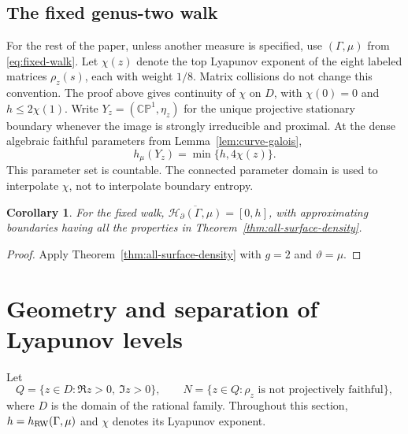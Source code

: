 \documentclass[11pt,letterpaper]{amsart}
\newtheorem{corollary}[theorem]{Corollary}
\theoremstyle{definition}
\theoremstyle{remark}
\numberwithin{equation}{section}
\newcommand{\CP}{\mathbb{CP}}
\newcommand{\HH}{\mathscr H_{\partial}}
\begin{document}
\subsection{The fixed genus-two walk}
For the rest of the paper, unless another measure is specified, use
$(\Gamma,\mu)$ from \eqref{eq:fixed-walk}. Let $\chi(z)$ denote the top
Lyapunov exponent of the eight labeled matrices $\rho_z(s)$, each with
weight $1/8$. Matrix collisions do not change this convention.
The proof above gives continuity of $\chi$ on $D$, with
$\chi(0)=0$ and $h\le2\chi(1)$. Write $Y_z=(\CP^1,\eta_z)$ for the
unique projective stationary boundary whenever the image is strongly
irreducible and proximal. At the dense algebraic faithful parameters
from Lemma~\ref{lem:curve-galois},
\begin{equation}\label{eq:entropy-at-good-parameters}
 h_\mu(Y_z)=\min\{h,4\chi(z)\}.
\end{equation}
This parameter set is countable. The connected parameter domain is
used to interpolate $\chi$, not to interpolate boundary entropy.

\begin{corollary}\label{thm:full-density}
For the fixed walk, $\overline{\HH(\Gamma,\mu)}=[0,h]$, with
approximating boundaries having all the properties in
Theorem~\ref{thm:all-surface-density}.
\end{corollary}
\begin{proof}
Apply Theorem~\ref{thm:all-surface-density} with $g=2$ and
$\vartheta=\mu$.
\end{proof}

\section{Geometry and separation of Lyapunov levels}
\label{sec:level-test}

Let
\[
 Q=\{z\in D:\Re z>0,\ \Im z>0\},\qquad
 N=\{z\in Q:\rho_z\text{ is not projectively faithful}\},
\]
where $D$ is the domain of the rational family. Throughout this section,
$h=h_{\rm RW}(\Gamma,\mu)$ and $\chi$ denotes its Lyapunov exponent.
\end{document}
